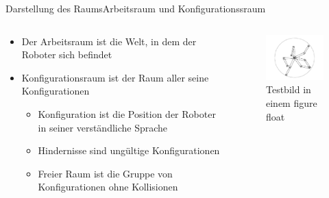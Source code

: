 \documentclass[t,aspectratio=169,dvipsnames]{beamer}
\begin{document}
\begin{frame}{Darstellung des Raums}{Arbeitsraum und Konfigurationssraum}
	\begin{columns}
		\begin{column}[T]{0.6\textwidth}
			\begin{itemize}
				\item Der Arbeitsraum ist die Welt, in dem der Roboter sich befindet\newline
				\item Konfigurationsraum ist der Raum aller seine Konfigurationen
				\begin{itemize}
					\item Konfiguration ist die Position der Roboter in seiner verständliche Sprache
					\item Hindernisse sind ungültige Konfigurationen
					\item Freier Raum ist die Gruppe von Konfigurationen ohne Kollisionen
					
				\end{itemize}
			\end{itemize}
		\end{column}
		\begin{column}[T]{0.4\textwidth}
			\begin{figure}
				\includegraphics[width=4.5cm]{images/Bild2.png}
				\caption{Testbild in einem figure float} 
			\end{figure}
		\end{column}
	\end{columns}
\end{frame}
\end{document}
